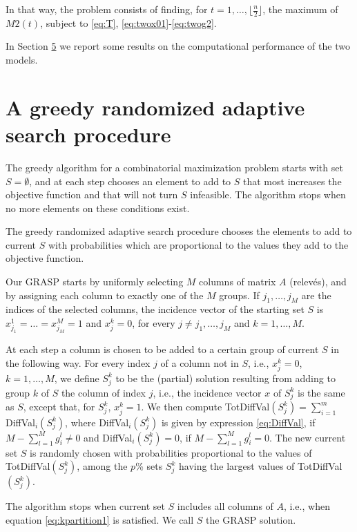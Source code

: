 In that way, the problem consists of finding, for \(t=1,\dots, \lfloor\frac{n}{2}\rfloor\), the maximum of \(M2(t)\), subject to \eqref{eq:T}, \eqref{eq:twox01}-\eqref{eq:twog2}.

In Section \hyperref[implementation]{5} we report some results on the computational performance of the two models.

\section{A greedy randomized adaptive search procedure}\label{GRASP}

The greedy algorithm for a combinatorial maximization problem starts with set \(S=\emptyset\), and at each step chooses an element to add to \(S\) that most increases the objective function and that will not turn \(S\) infeasible. The algorithm stops when no more elements on these conditions exist.

The greedy randomized adaptive search procedure \citep[GRASP, see][]{FR1995, FR2018} chooses the elements to add to current \(S\) with probabilities which are proportional to the values they add to the objective function.

Our GRASP starts by uniformly selecting \(M\) columns of matrix \(A\) (relevés), and by assigning each column to exactly one of the \(M\) groups. If \(j_1,\dots, j_M\) are the indices of the selected columns, the incidence vector of the starting set \(S\) is \(x_{j_1}^1=\dots=x_{j_M}^M=1\) and \(x_j^k=0\), for every \(j\not=j_1,\dots, j_M\) and \(k=1,\dots,M\).

At each step a column is chosen to be added to a certain group of current \(S\) in the following way. For every index \(j\) of a column not in \(S\), i.e., \(x_j^k=0\), \(k=1,\dots,M\), we define \(S_j^k\) to be the (partial) solution resulting from adding to group \(k\) of \(S\) the column of index \(j\), i.e., the incidence vector \(x\) of \(S_j^k\) is the same as \(S\), except that, for \(S_j^k\), \(x_j^k=1\). We then compute TotDiffVal\((S_j^k)=\sum_{i=1}^m\) DiffVal\(_i(S_j^k)\), where DiffVal\(_i(S_j^k)\) is given by expression \eqref{eq:DiffVal}, if \(M-\sum_{l=1}^M g_i^l\not= 0\) and DiffVal\(_i(S_j^k)=0\), if \(M-\sum_{l=1}^M g_i^l= 0\).
The new current set \(S\) is randomly chosen with probabilities proportional to the values of TotDiffVal\((S_j^k)\), among the \(p\)\% sets \(S_j^k\) having the largest values of TotDiffVal\((S_j^k)\).

The algorithm stops when current set \(S\) includes all columns of \(A\), i.e., when equation \eqref{eq:kpartition1} is satisfied.
We call \(S\) the GRASP solution.

